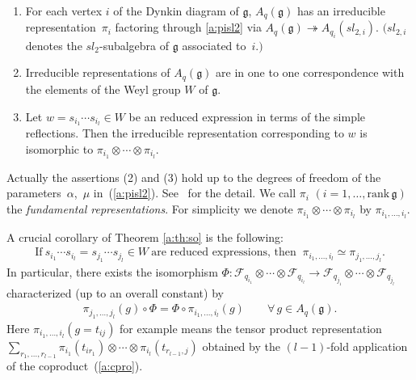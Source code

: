 \begin{theorem}[\cite{So2,VS}]\label{a:th:so}
\qquad
\begin{enumerate}\itemsep=0pt
\item[$(1)$]  For each vertex $i$
of the Dynkin diagram of $\mathfrak{g}$,
$A_q(\mathfrak{g})$ has an irreducible
representa\-tion~$\pi_i$ factoring through
\eqref{a:pisl2} via
$A_q(\mathfrak{g}) \twoheadrightarrow
A_{q_i}(sl_{2,i})$.
$(sl_{2,i}$ denotes the $sl_2$-subalgebra of $\mathfrak{g}$
asso\-ciated to~$i.)$

\item[$(2)$] Irreducible representations of $A_q(\mathfrak{g})$ are
in one to one correspondence with the elements of the Weyl group
$W$ of $\mathfrak{g}$.

\item[$(3)$] Let $w =s_{i_1}\cdots s_{i_l} \in W$ be an
reduced expression in terms of the simple reflections.
Then the irreducible representation corresponding to $w$ is
isomorphic to $\pi_{i_1}\otimes \cdots \otimes \pi_{i_l}$.
\end{enumerate}
\end{theorem}

Actually the assertions (2) and (3) hold
up to the degrees of freedom of the parame\-ters~$\alpha$,~$\mu$ in~(\ref{a:pisl2}).
See~\cite{So2} for the detail.
We call $\pi_i$ $(i = 1,\ldots, \mathrm{rank}\, \mathfrak{g})$
the {\em fundamental representations}.
For simplicity we denote
$\pi_{i_1} \otimes \cdots \otimes \pi_{i_l}$
by $\pi_{i_1,\ldots, i_l}$.

A crucial corollary of Theorem \ref{a:th:so} is the following:
\begin{gather*}
\mathrm{If } \ s_{i_1}\cdots s_{i_l} = s_{j_1}\cdots s_{j_l}
\in W \
\text{are reduced expressions, then } \
\pi_{i_1, \ldots, i_l} \simeq \pi_{j_1, \ldots, j_l}.
\end{gather*}
In particular, there exists the isomorphism
$\Phi: \mathcal{F}_{q_{i_1}}\otimes \cdots \otimes \mathcal{F}_{q_{i_l}}
\rightarrow
\mathcal{F}_{q_{j_1}}\otimes \cdots \otimes \mathcal{F}_{q_{j_l}}$
characterized (up to an overall constant) by
\begin{gather*}
\pi_{j_1, \ldots, j_l}(g)\circ \Phi = \Phi \circ \pi_{i_1, \ldots, i_l}(g)\qquad
\forall\, g \in A_q(\mathfrak{g}).
\end{gather*}
Here $\pi_{i_1, \ldots, i_l}(g=t_{ij})$ for example
means the tensor product representation
$\sum_{r_1,\ldots, r_{l-1}}
\pi_{i_1}(t_{i r_1}) \otimes \cdots \otimes \pi_{i_l}(t_{r_{l-1},j})$
obtained by the $(l-1)$-fold application of the
coproduct~(\ref{a:cpro}).

